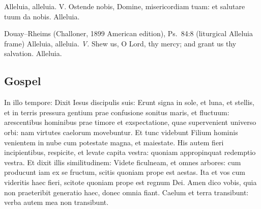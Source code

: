 \begin{latinproper}
Alleluia, alleluia. \textnormal{V.} Ostende nobis, Domine, misericordiam tuam: et salutare tuum da nobis. Alleluia.
\end{latinproper}

\begin{englishwitness}{Douay--Rheims (Challoner, 1899 American edition), Ps.~84:8 (liturgical Alleluia frame)}
Alleluia, alleluia. \textit{V.} Shew us, O Lord, thy mercy; and grant us thy salvation. Alleluia.
\end{englishwitness}

\subsection{Gospel}\label{proper-gospel}

\begin{latinproper}
In illo tempore: Dixit Iesus discipulis suis: Erunt signa in sole, et luna, et stellis, et in terris pressura gentium prae confusione sonitus maris, et fluctuum: arescentibus hominibus prae timore et exspectatione, quae supervenient universo orbi: nam virtutes caelorum movebuntur. Et tunc videbunt Filium hominis venientem in nube cum potestate magna, et maiestate. His autem fieri incipientibus, respicite, et levate capita vestra: quoniam appropinquat redemptio vestra. Et dixit illis similitudinem: Videte ficulneam, et omnes arbores: cum producunt iam ex se fructum, scitis quoniam prope est aestas. Ita et vos cum videritis haec fieri, scitote quoniam prope est regnum Dei. Amen dico vobis, quia non praeteribit generatio haec, donec omnia fiant. Caelum et terra transibunt: verba autem mea non transibunt.
\end{latinproper}

